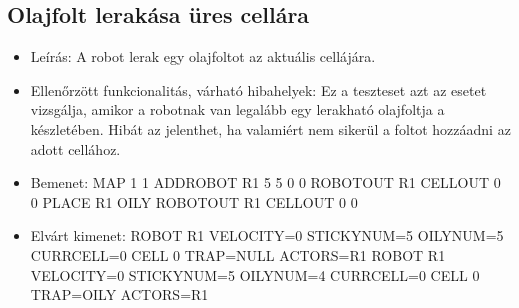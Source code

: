 \subsection{Olajfolt lerakása üres cellára}
\begin{itemize}
	\item Leírás: \newline
A robot lerak egy olajfoltot az aktuális cellájára.
	\item Ellenőrzött funkcionalitás, várható hibahelyek: \newline
Ez a teszteset azt az esetet vizsgálja, amikor a robotnak van legalább egy lerakható olajfoltja a készletében. Hibát az jelenthet, ha valamiért nem sikerül a foltot hozzáadni az adott cellához.
	\item Bemenet: \newline
MAP 1 1 \newline
ADDROBOT R1 5 5 0 0	 \newline
ROBOTOUT R1 \newline
CELLOUT 0 0 \newline
PLACE R1 OILY \newline
ROBOTOUT R1 \newline
CELLOUT 0 0
	\item Elvárt kimenet: \newline
ROBOT R1 VELOCITY=0 STICKYNUM=5 OILYNUM=5 CURRCELL=0 \newline
CELL 0 TRAP=NULL ACTORS=R1 \newline
ROBOT R1 VELOCITY=0 STICKYNUM=5 OILYNUM=4 CURRCELL=0 \newline
CELL 0 TRAP=OILY ACTORS=R1

\end{itemize}


